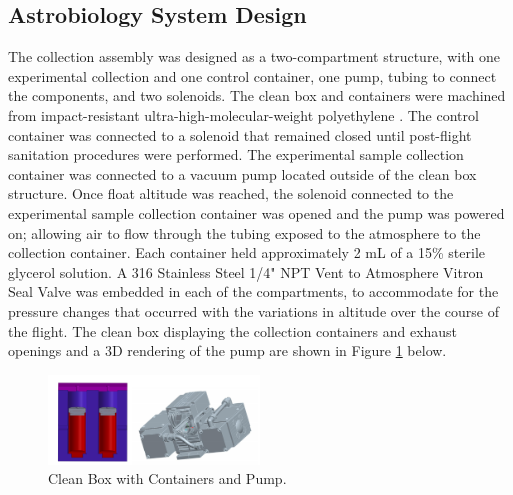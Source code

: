 \subsection{Astrobiology System Design}
\label{sec:Astrobiology Design}
The collection assembly was designed as a two-compartment structure, with one experimental collection and one control container, one pump, tubing to connect the components, and two solenoids. The clean box and containers were machined from impact-resistant ultra-high-molecular-weight polyethylene \cite{cleanbox}. The control container was connected to a solenoid that remained closed until post-flight sanitation procedures were performed. The experimental sample collection container was connected to a vacuum pump located outside of the clean box structure. Once float altitude was reached, the solenoid connected to the experimental sample collection container was opened and the pump was powered on; allowing air to flow through the tubing exposed to the atmosphere to the collection container. Each container held approximately 2 mL of a 15\% sterile glycerol solution. A 316 Stainless Steel 1/4" NPT Vent to Atmosphere Vitron Seal Valve was embedded in each of the compartments, to accommodate for the pressure changes that occurred with the variations in altitude over the course of the flight. The clean box displaying the collection containers and exhaust openings and a 3D rendering of the pump are shown in Figure \ref{fig:Astro System} below.

\begin{figure}[H]
	\begin{center}
		\includegraphics[width=0.5\textwidth]{figures/Astro_Figs.pdf}
		\caption{Clean Box with Containers and Pump.}
		\label{fig:Astro System}
	\end{center}
\end{figure}
%

